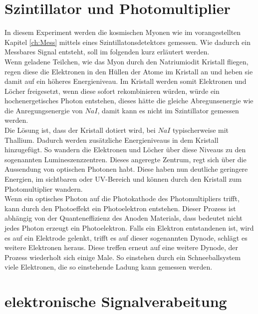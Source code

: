 \documentclass[12pt,a4paper,ngerman]{report}
\begin{document}
	\section{Szintillator und Photomultiplier}
	In diesem Experiment werden die kosmischen Myonen wie im vorangestellten Kapitel \ref{ch:Mess} mittels eines Szintillatonsdetektors gemessen. Wie dadurch ein Messbares Signal entsteht, soll im folgenden kurz erläutert werden.\\
	Wenn geladene Teilchen, wie das Myon durch den Natriumiodit Kristall fliegen, regen diese die Elektronen in den Hüllen der Atome im Kristall an und heben sie damit auf ein höheres Energieniveau. Im Kristall werden somit Elektronen und Löcher freigesetzt, wenn diese sofort rekombinieren würden, würde ein hochenergetisches Photon entstehen, dieses hätte die gleiche Abregunsenergie wie die Anregungsenergie von $NaI$, damit kann es nicht im Szintillator gemessen werden.\\
	Die Lösung ist, dass der Kristall dotiert wird, bei $NaI$ typischerweise mit Thallium. Dadurch werden zusätzliche Energieniveaus in dem Kristall hinzugefügt. So wandern die Elektronen und Löcher über diese Niveaus zu den sogenannten Lumineszenzzentren. Dieses angeregte Zentrum, regt sich über die Aussendung von optischen Photonen habt. Diese haben nun deutliche geringere Energien, im sichtbaren oder UV-Bereich und können durch den Kristall zum Photomultiplier wandern.\\
	Wenn ein optisches Photon auf die Photokathode des Photomultipliers trifft, kann durch den Photoeffekt ein Photoelektron entstehen. Dieser Prozess ist abhängig von der Quanteneffizienz des Anoden Materials, dass bedeutet nicht jedes Photon erzeugt ein Photoelektron. Falls ein Elektron entstandenen ist, wird es auf ein Elektrode gelenkt, trifft es auf dieser sogenannten Dynode, schlägt es weitere Elektronen heraus. Diese treffen erneut auf eine weitere Dynode, der Prozess wiederholt sich einige Male. So einstehen durch ein Schneeballsystem viele Elektronen, die so einstehende Ladung kann gemessen werden.  
	
	 
	\section{elektronische Signalverabeitung}
\end{document}

